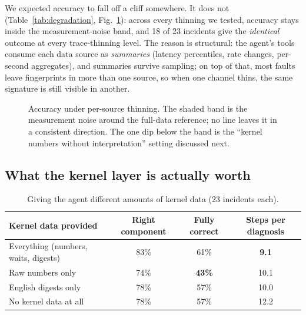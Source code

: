 We expected accuracy to fall off a cliff somewhere. It does not
(Table~\ref{tab:degradation}, Fig.~\ref{fig:degradation}): across every thinning we
tested, accuracy stays inside the measurement-noise band, and 18 of 23 incidents give
the \emph{identical} outcome at every trace-thinning level. The reason is structural:
the agent's tools consume each data source as \emph{summaries} (latency percentiles,
rate changes, per-second aggregates), and summaries survive sampling; on top of that,
most faults leave fingerprints in more than one source, so when one channel thins,
the same signature is still visible in another.

\begin{figure}[h]
\centering
{}
\caption{Accuracy under per-source thinning. The shaded band is the measurement
noise around the full-data reference; no line leaves it in a consistent direction.
The one dip below the band is the ``kernel numbers without interpretation'' setting
discussed next.}
\label{fig:degradation}
\end{figure}

\subsection{What the kernel layer is actually worth}

\begin{table}[h]
\centering
\caption{Giving the agent different amounts of kernel data (23 incidents each).}
\label{tab:kernel}
\begin{tabular}{lccc}
\toprule
Kernel data provided & Right component & Fully correct & Steps per diagnosis \\
\midrule
Everything (numbers, waits, digests) & 83\% & 61\% & \textbf{9.1} \\
Raw numbers only & 74\% & \textbf{43\%} & 10.1 \\
English digests only & 78\% & 57\% & 10.0 \\
No kernel data at all & 78\% & 57\% & 12.2 \\
\bottomrule
\end{tabular}
\end{table}

